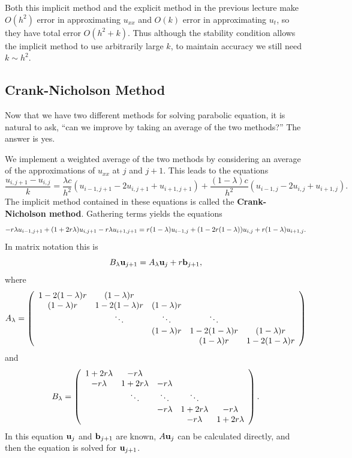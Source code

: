 Both this implicit method and the explicit method in the previous
lecture make $O(h^2)$ error in approximating $u_{xx}$ and $O(k)$ error
in approximating $u_t$, so they have total error $O(h^2+k)$. Thus
although the stability condition allows the implicit method to use
arbitrarily large $k$, to maintain accuracy we still need $k\sim h^2$.


\subsection*{Crank-Nicholson Method}

Now that we have two different methods for solving parabolic
equation, it is natural to ask, ``can we improve by taking
an average of the two methods?'' The answer is yes.

We implement a weighted average of the two methods by considering
an average of the approximations of $u_{xx}$ at $j$ and $j+1$.
This leads to the equations
\begin{equation}
\frac{u_{i,j+1} - u_{i,j}}{k}
= \frac{\lambda c}{h^2} ( u_{i-1,j+1} - 2 u_{i,j+1} + u_{i+1,j+1} )
+  \frac{(1-\lambda) c}{h^2} ( u_{i-1,j} - 2 u_{i,j} + u_{i+1,j} ).
\end{equation}
The implicit method contained in these equations is called the
{\bf Crank-Nicholson method}.
Gathering terms yields the equations
$$
  -r \lambda u_{i-1,j+1} + (1+2r\lambda) u_{i,j+1} - r\lambda u_{i+1,j+1}
       = r(1-\lambda) u_{i-1,j} + (1 - 2r(1-\lambda)) u_{i,j} + r(1-\lambda) u_{i+1,j}.
$$
In matrix notation this is
$$
   B_\lambda \mathbf{u}_{j+1} = A_\lambda \mathbf{u}_j + r\mathbf{b}_{j+1},
$$
where
\begin{equation*}
A_\lambda = \left( \begin{array}{ccccc}
          1-2(1-\lambda)r & (1-\lambda)r &        &        &   \\
            (1-\lambda)r  & 1-2(1-\lambda)r & (1-\lambda)r &        &   \\
                      & \ddots      & \ddots & \ddots &   \\
                      &             & (1-\lambda)r & 1-2(1-\lambda)r   & (1-\lambda)r \\
                      &             &          &   (1-\lambda)r    & 1-2(1-\lambda)r
            \end{array}
     \right)
\end{equation*}
and
\begin{equation*}
B_\lambda = \left( \begin{array}{ccccc}
          1+2r\lambda &  -r\lambda    &        &        &   \\
           -r\lambda  &  1+2r\lambda  &  -r\lambda    &        &   \\
               & \ddots & \ddots & \ddots &   \\
               &        &  -r\lambda    & 1+2r\lambda   & -r\lambda\\
               &        &        &   -r\lambda   & 1+2r\lambda
            \end{array}
     \right).
\end{equation*}
In this equation $\mathbf{u}_j$ and $\mathbf{b}_{j+1}$ are known, $A \mathbf{u}_j$ can be
calculated directly, and then the equation is solved for $\mathbf{u}_{j+1}$.

